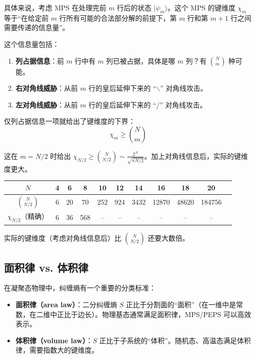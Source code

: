 \documentclass[12pt,a4paper]{ctexart}
\begin{document}
具体来说，考虑 MPS 在处理完前 $m$ 行后的状态 $|\psi_m\rangle$。这个 MPS 的键维度 $\chi_m$ 等于``在给定前 $m$ 行所有可能的合法部分解的前提下，第 $m$ 行和第 $m+1$ 行之间需要传递的信息量''。

这个信息量包括：
\begin{enumerate}
\item \textbf{列占据信息}：前 $m$ 行中有 $m$ 列已被占据，具体是哪 $m$ 列？有 $\binom{N}{m}$ 种可能。
\item \textbf{右对角线威胁}：从前 $m$ 行的皇后延伸下来的 ``$\backslash$'' 对角线攻击。
\item \textbf{左对角线威胁}：从前 $m$ 行的皇后延伸下来的 ``/'' 对角线攻击。
\end{enumerate}

仅列占据信息一项就给出了键维度的下界：
\begin{equation}
\boxed{\chi_m \geq \binom{N}{m}}
\end{equation}

这在 $m = N/2$ 时给出 $\chi_{N/2} \geq \binom{N}{N/2} \sim \frac{2^N}{\sqrt{\pi N/2}}$。加上对角线信息后，实际的键维度更大。

\begin{center}
\begin{tabular}{c|cccccccccc}
\toprule
$N$ & 4 & 6 & 8 & 10 & 12 & 14 & 16 & 18 & 20 \\
\midrule
$\binom{N}{N/2}$ & 6 & 20 & 70 & 252 & 924 & 3432 & 12870 & 48620 & 184756 \\
$\chi_{N/2}$（精确） & 6 & 36 & 568 & -- & -- & -- & -- & -- & -- \\
\bottomrule
\end{tabular}
\end{center}

实际的键维度（考虑对角线信息后）比 $\binom{N}{N/2}$ 还要大数倍。

\subsection{面积律 vs. 体积律}

在凝聚态物理中，纠缠熵有一个重要的分类标准：

\begin{itemize}
\item \textbf{面积律（area law）}：二分纠缠熵 $S$ 正比于分割面的``面积''（在一维中是常数，在二维中正比于边长）。物理基态通常满足面积律，MPS/PEPS 可以高效表示。
\item \textbf{体积律（volume law）}：$S$ 正比于子系统的``体积''。随机态、高温态满足体积律，需要指数大的键维度。
\end{itemize}
\end{document}
